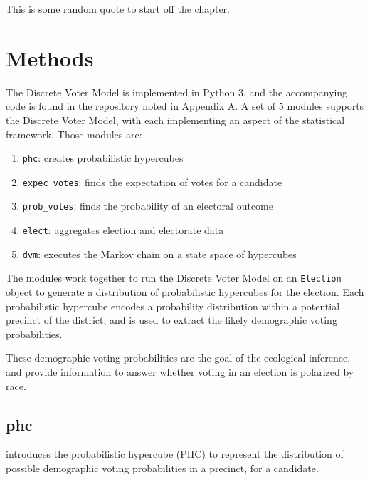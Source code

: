 \begin{savequote}[75mm]
This is some random quote to start off the chapter.
\end{savequote}

\chapter{Methods}

The Discrete Voter Model is implemented in Python 3, and the accompanying code is found in the repository noted in \hyperref[chap:appendix]{Appendix A}. A set of $5$ modules supports the Discrete Voter Model, with each implementing an aspect of the statistical framework. Those modules are:

\begin{enumerate}
  \item \texttt{phc}: creates probabilistic hypercubes
  \item \texttt{expec\_votes}: finds the expectation of votes for a candidate
  \item \texttt{prob\_votes}: finds the probability of an electoral outcome
  \item \texttt{elect}: aggregates election and electorate data
  \item \texttt{dvm}: executes the Markov chain on a state space of hypercubes
\end{enumerate}

The modules work together to run the Discrete Voter Model on an \texttt{Election} object to generate a distribution of probabilistic hypercubes for the election. Each probabilistic hypercube encodes a probability distribution within a potential precinct of the district, and is used to extract the likely demographic voting probabilities.

These demographic voting probabilities are the goal of the ecological inference, and provide information to answer whether voting in an election is polarized by race.

\section{phc}
\label{sec:phc}

 introduces the probabilistic hypercube (PHC) to represent the distribution of possible demographic voting probabilities in a precinct, for a candidate.


